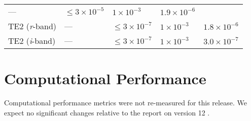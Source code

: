 \documentclass[DM,toc]{lsstdoc}
\begin{document}
\begin{longtable}[]{@{}lllll@{}}
\begin{minipage}[t]{0.05\columnwidth}
---\strut
\end{minipage} & \begin{minipage}[t]{0.24\columnwidth}\raggedright\strut
\(\leq 3\times 10^{-5}\)\strut
\end{minipage} & \begin{minipage}[t]{0.21\columnwidth}\raggedright\strut
\(1 \times 10^{-3}\)\strut
\end{minipage} & \begin{minipage}[t]{0.22\columnwidth}\raggedright\strut
\(1.9 \times 10^{-6}\)\strut
\end{minipage}\tabularnewline
\begin{minipage}[t]{0.13\columnwidth}\raggedright\strut
TE2 (\emph{r}-band)\strut
\end{minipage} & \begin{minipage}[t]{0.05\columnwidth}\raggedright\strut
---\strut
\end{minipage} & \begin{minipage}[t]{0.24\columnwidth}\raggedright\strut
\(\leq 3\times 10^{-7}\)\strut
\end{minipage} & \begin{minipage}[t]{0.21\columnwidth}\raggedright\strut
\(1 \times 10^{-3}\)\strut
\end{minipage} & \begin{minipage}[t]{0.22\columnwidth}\raggedright\strut
\(1.8 \times 10^{-6}\)\strut
\end{minipage}\tabularnewline
\begin{minipage}[t]{0.13\columnwidth}\raggedright\strut
TE2 (\emph{i}-band)\strut
\end{minipage} & \begin{minipage}[t]{0.05\columnwidth}\raggedright\strut
---\strut
\end{minipage} & \begin{minipage}[t]{0.24\columnwidth}\raggedright\strut
\(\leq 3\times 10^{-7}\)\strut
\end{minipage} & \begin{minipage}[t]{0.21\columnwidth}\raggedright\strut
\(1 \times 10^{-3}\)\strut
\end{minipage} & \begin{minipage}[t]{0.22\columnwidth}\raggedright\strut
\(3.0 \times 10^{-7}\)\strut
\end{minipage}\tabularnewline
\bottomrule
\end{longtable}

\section{Computational Performance}\label{computational-performance}

Computational performance metrics were not re-measured for this release.
We expect no significant changes relative to the
report on version 12 .


\end{document}

